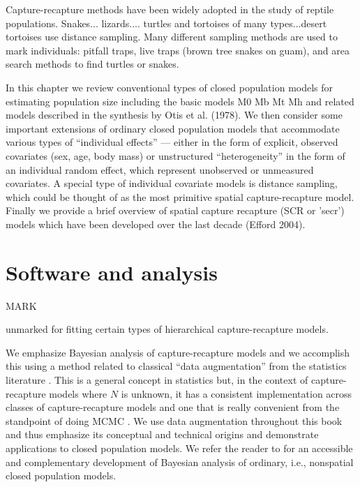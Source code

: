 \documentclass{book}
\begin{document}
Capture-recapture methods have been widely adopted in the study of
reptile populations.  
Snakes...
lizards....
turtles and tortoises of many types...desert tortoises use distance
sampling. 
Many different sampling methods are used to mark individuals: pitfall
traps, live traps (brown tree snakes on guam), and area search methods
to find turtles or snakes. 

In this chapter we review conventional types of closed population
models for estimating population size including the basic models M0 Mb
Mt Mh and related models described in the synthesis by Otis et
al. (1978).  
We then consider some important extensions of
ordinary closed population models that accommodate various types of
``individual effects'' --- either in the form of explicit, observed
covariates (sex, age, body mass) or unstructured ``heterogeneity'' in
the form of an individual random effect, which represent 
unobserved or unmeasured covariates.  A special type of individual
covariate models is distance sampling, which could be thought of as
the most primitive spatial capture-recapture model. 
Finally we provide a brief
overview of spatial capture recapture (SCR or 'secr') models which
have been developed over the last decade (Efford 2004). 




\section{Software and analysis}

MARK

unmarked for fitting certain types of hierarchical capture-recapture
models. 

We emphasize Bayesian analysis of capture-recapture models and we
accomplish this using a method related to classical ``data
augmentation'' from the statistics literature
\citep[e.g.,][]{tanner_wong:1987}.  This is a general concept in
statistics but, in the context of capture-recapture models where $N$
is unknown, it has a consistent implementation across classes of
capture-recapture models and one that is really convenient from the
standpoint of doing MCMC
\citep{royle_etal:2007,royle_dorazio:2012}. We use data augmentation
throughout this book and thus emphasize its conceptual and technical
origins and demonstrate applications to closed population models.  We
refer the reader to \citet[][ch. 6]{kery_schaub:2011} for an
accessible and complementary development of Bayesian analysis of
ordinary, i.e., nonspatial closed population models.
\end{document}
